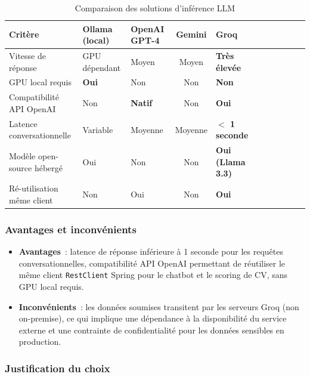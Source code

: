 \begin{table}[H]
\centering
\caption{Comparaison des solutions d'inférence LLM}
\label{tab:cmp_llm}
\begin{tabularx}{\textwidth}{VlVCVCVCVCV}
\hline
\textbf{Critère} & \textbf{Ollama (local)} & \textbf{OpenAI GPT-4} & \textbf{Gemini} & \textbf{Groq} \\
\hline
Vitesse de réponse           & GPU dépendant & Moyen & Moyen & \textbf{Très élevée} \\
\hline
GPU local requis             & \textbf{Oui}  & Non   & Non   & \textbf{Non} \\
\hline
Compatibilité API OpenAI     & Non      & \textbf{Natif} & Non  & \textbf{Oui} \\
\hline
Latence conversationnelle    & Variable & Moyenne & Moyenne & \textbf{$<$ 1 seconde} \\
\hline
Modèle open-source hébergé   & Oui      & Non     & Non     & \textbf{Oui (Llama 3.3)} \\
\hline
Ré-utilisation même client   & Non      & Oui     & Non     & \textbf{Oui} \\
\hline
\end{tabularx}
\end{table}

\subsubsection*{Avantages et inconvénients}

\begin{itemize}[leftmargin=*,nosep]
  \item \textbf{Avantages}~: latence de réponse inférieure à 1 seconde pour les
        requêtes conversationnelles, compatibilité API OpenAI permettant de réutiliser
        le même client \texttt{RestClient} Spring pour le chatbot et le scoring de CV,
        sans GPU local requis.
  \item \textbf{Inconvénients}~: les données soumises transitent par les serveurs Groq
        (non on-premise), ce qui implique une dépendance à la disponibilité du service
        externe et une contrainte de confidentialité pour les données sensibles en production.
\end{itemize}

\subsubsection*{Justification du choix}

